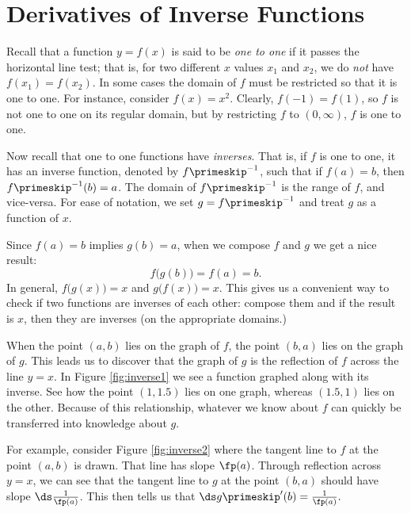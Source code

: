 \section{Derivatives of Inverse Functions}\label{sec:deriv_inverse_function}

Recall that a function $y=f(x)$ is said to be \textit{one to one} if it passes the horizontal line test; that is, for two different $x$ values $x_1$ and $x_2$, we do \textit{not} have $f(x_1)=f(x_2)$. In some cases the domain of $f$ must be restricted so that it is one to one. For instance, consider $f(x)=x^2$. Clearly, $f(-1)= f(1)$, so $f$ is not one to one on its regular domain, but by restricting $f$ to $(0,\infty)$, $f$ is one to one.

Now recall that one to one functions have \textit{inverses}. That is, if $f$ is one to one, it has an inverse function, denoted by $f\primeskip^{-1}$, such that if $f(a)=b$, then $f\primeskip^{-1}(b) = a$. The domain of $f\primeskip^{-1}$ is the range of $f$, and vice-versa. For ease of notation, we set $g=f\primeskip^{-1}$ and treat $g$ as a function of $x$.

Since $f(a)=b$ implies $g(b)=a$, when we compose $f$ and $g$ we get a nice result: $$f\big(g(b)\big) = f(a) = b.$$ In general, $f\big(g(x)\big) =x$ and $g\big(f(x)\big) = x$. This gives us a convenient way to check if two functions are inverses of each other: compose them and if the result is $x$, then they are inverses (on the appropriate domains.)

When the point $(a,b)$ lies on the graph of $f$, the point $(b,a)$ lies on the graph of $g$. This leads us to discover that the graph of $g$ is the reflection of $f$ across the line $y=x$. In Figure \ref{fig:inverse1} we see a function graphed along with its inverse. See how the point $(1,1.5)$ lies on one graph, whereas $(1.5,1)$ lies on the other. Because of this relationship, whatever we know about $f$ can quickly be transferred into knowledge about $g$.


For example, consider Figure \ref{fig:inverse2} where the tangent line to $f$ at the point $(a,b)$ is drawn. That line has slope $\fp(a)$. Through reflection across $y=x$, we can see that the tangent line to $g$ at the point $(b,a)$ should have slope $\ds \frac{1}{\fp(a)}$. This then tells us that $\ds g\primeskip'(b) = \frac{1}{\fp(a)}.$

